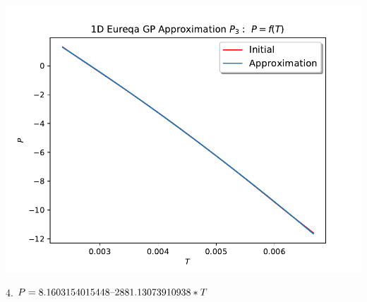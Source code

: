 \documentclass[english,12pt,a4paper]{article}
\theoremstyle{definition}
\begin{document}
\includegraphics[scale=0.7]{Test1DEqP3}

\vspace{0.5cm}

4. $P=8.1603154015448\text{\textendash}2881.13073910938*T$
\end{document}
